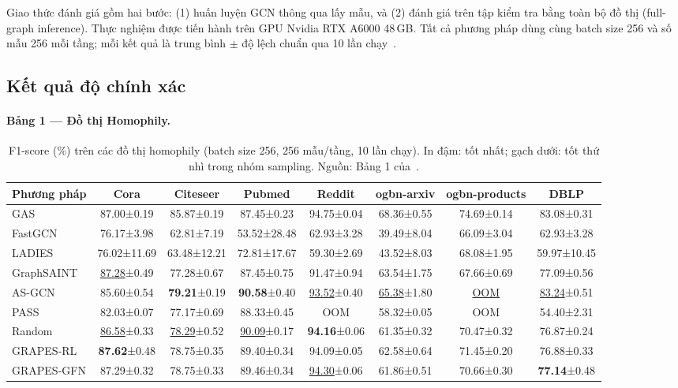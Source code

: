 Giao thức đánh giá gồm hai bước: (1) huấn luyện GCN thông qua lấy mẫu, và (2) đánh giá trên tập kiểm tra bằng toàn bộ đồ thị (full-graph inference). Thực nghiệm được tiến hành trên GPU Nvidia RTX A6000 48\,GB. Tất cả phương pháp dùng cùng batch size 256 và số mẫu 256 mỗi tầng; mỗi kết quả là trung bình $\pm$ độ lệch chuẩn qua 10 lần chạy~\cite{Younesian2023GRAPES}.

\subsection{Kết quả độ chính xác}

\paragraph{Bảng 1 — Đồ thị Homophily.}

\begin{table}[H]
\centering
\caption{F1-score (\%) trên các đồ thị homophily (batch size 256, 256 mẫu/tầng, 10 lần chạy). In đậm: tốt nhất; gạch dưới: tốt thứ nhì trong nhóm sampling. Nguồn: Bảng 1 của~\cite{Younesian2023GRAPES}.}
\label{tab:ketqua_f1}
\small
\setlength{\tabcolsep}{4pt}
\begin{tabular}{l c c c c c c c}
\toprule
\textbf{Phương pháp} & \textbf{Cora} & \textbf{Citeseer} & \textbf{Pubmed} & \textbf{Reddit} & \textbf{ogbn-arxiv} & \textbf{ogbn-products} & \textbf{DBLP} \\
\midrule
GAS             & 87.00±0.19 & 85.87±0.19 & 87.45±0.23 & 94.75±0.04 & 68.36±0.55 & 74.69±0.14 & 83.08±0.31 \\
\midrule
FastGCN         & 76.17±3.98 & 62.81±7.19 & 53.52±28.48 & 62.93±3.28 & 39.49±8.04 & 66.09±3.04 & 62.93±3.28 \\
LADIES          & 76.02±11.69 & 63.48±12.21 & 72.81±17.67 & 59.30±2.69 & 43.52±8.03 & 68.08±1.95 & 59.97±10.45 \\
GraphSAINT      & \underline{87.28}±0.49 & 77.28±0.67 & 87.45±0.75 & 91.47±0.94 & 63.54±1.75 & 67.66±0.69 & 77.09±0.56 \\
AS-GCN          & 85.60±0.54 & \textbf{79.21}±0.19 & \textbf{90.58}±0.40 & \underline{93.52}±0.40 & \underline{65.38}±1.80 & \underline{OOM} & \underline{83.24}±0.51 \\
PASS            & 82.03±0.07 & 77.17±0.69 & 88.33±0.45 & OOM & 58.32±0.05 & OOM & 54.40±2.31 \\
Random          & \underline{86.58}±0.33 & \underline{78.29}±0.52 & \underline{90.09}±0.17 & \textbf{94.16}±0.06 & 61.35±0.32 & 70.47±0.32 & 76.87±0.24 \\
\midrule
GRAPES-RL       & \textbf{87.62}±0.48 & 78.75±0.35 & 89.40±0.34 & 94.09±0.05 & 62.58±0.64 & 71.45±0.20 & 76.88±0.33 \\
GRAPES-GFN      & 87.29±0.32 & 78.75±0.33 & 89.46±0.34 & \underline{94.30}±0.06 & 61.86±0.51 & 70.66±0.30 & \textbf{77.14}±0.48 \\
\bottomrule
\end{tabular}
\end{table}

